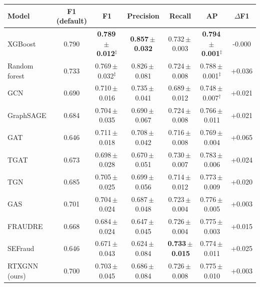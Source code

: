 \begin{tabular}{lcccccc}
\toprule
Model & F1 (default) & F1 & Precision & Recall & AP & $\Delta$F1\\
\midrule
XGBoost & 0.790 & \textbf{0.789\,$\pm$\,0.012}$^{\ddagger}$ & \textbf{0.857\,$\pm$\,0.032} & 0.732\,$\pm$\,0.003 & \textbf{0.794\,$\pm$\,0.001}$^{\ddagger}$ & -0.000\\
Random forest & 0.733 & 0.769\,$\pm$\,0.032$^{\ddagger}$ & 0.826\,$\pm$\,0.081 & 0.724\,$\pm$\,0.008 & 0.788\,$\pm$\,0.001$^{\ddagger}$ & +0.036\\
GCN & 0.690 & 0.710\,$\pm$\,0.016 & 0.735\,$\pm$\,0.041 & 0.689\,$\pm$\,0.012 & 0.748\,$\pm$\,0.007$^{\dagger}$ & +0.021\\
GraphSAGE & 0.684 & 0.704\,$\pm$\,0.035 & 0.690\,$\pm$\,0.067 & 0.724\,$\pm$\,0.008 & 0.766\,$\pm$\,0.011 & +0.021\\
GAT & 0.646 & 0.711\,$\pm$\,0.018 & 0.708\,$\pm$\,0.042 & 0.716\,$\pm$\,0.008 & 0.769\,$\pm$\,0.004 & +0.065\\
TGAT & 0.673 & 0.698\,$\pm$\,0.028 & 0.670\,$\pm$\,0.051 & 0.730\,$\pm$\,0.007 & 0.783\,$\pm$\,0.006 & +0.024\\
TGN & 0.685 & 0.705\,$\pm$\,0.025 & 0.699\,$\pm$\,0.056 & 0.714\,$\pm$\,0.012 & 0.773\,$\pm$\,0.009 & +0.020\\
GAS & 0.701 & 0.704\,$\pm$\,0.024 & 0.687\,$\pm$\,0.048 & 0.723\,$\pm$\,0.004 & 0.776\,$\pm$\,0.005 & +0.003\\
FRAUDRE & 0.668 & 0.684\,$\pm$\,0.024 & 0.647\,$\pm$\,0.045 & 0.726\,$\pm$\,0.004 & 0.775\,$\pm$\,0.003 & +0.015\\
SEFraud & 0.646 & 0.671\,$\pm$\,0.043 & 0.624\,$\pm$\,0.084 & \textbf{0.733\,$\pm$\,0.015} & 0.774\,$\pm$\,0.011 & +0.025\\
RTXGNN (ours) & 0.700 & 0.703\,$\pm$\,0.045 & 0.686\,$\pm$\,0.084 & 0.726\,$\pm$\,0.008 & 0.775\,$\pm$\,0.010 & +0.003\\
\bottomrule
\end{tabular}
